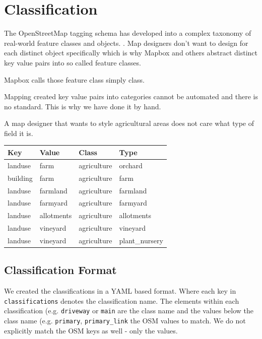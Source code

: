 \section{Classification}
\label{classification}

The OpenStreetMap tagging schema has developed into a complex taxonomy of real-world feature classes and objects. \cite[p. 15]{haklay2008openstreetmap}. Map designers don't want to design
for each distinct object specifically which is why Mapbox and others abstract distinct key value pairs into so called feature classes.

Mapbox calls those feature class simply class.

Mapping created key value pairs into categories cannot be automated
and there is no standard. This is why we have done it by hand.

A map designer that wants to style agricultural areas does not care
what type of field it is.

\begin{flushleft}
\begin{tabular}{llll}
Key      & Value      & Class       & Type           \\
\hline
landuse  & farm       & agriculture & orchard        \\
building & farm       & agriculture & farm           \\
landuse  & farmland   & agriculture & farmland       \\
landuse  & farmyard   & agriculture & farmyard       \\
landuse  & allotments & agriculture & allotments     \\
landuse  & vineyard   & agriculture & vineyard       \\
landuse  & vineyard   & agriculture & plant\_nursery
\end{tabular}
\end{flushleft}

\subsection{Classification Format}

We created the classifications in a YAML based format.
Where each key in \texttt{classifications} denotes the classification name. The elements within each classification (e.g. \texttt{driveway} or \texttt{main} are the class name and the values below the class name (e.g. \texttt{primary}, \texttt{primary\_link} the OSM values to match. We do not explicitly match the OSM keys as well - only the values.

